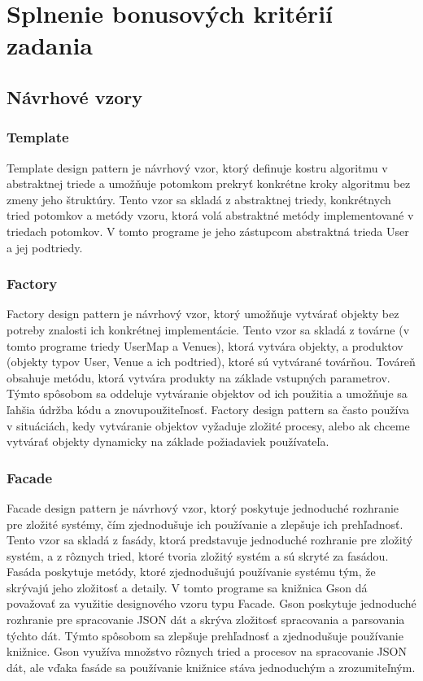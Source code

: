 \documentclass{article}
\begin{document}
\section{Splnenie bonusových kritérií zadania}
\subsection{Návrhové vzory}
\subsubsection{Template} 
Template design pattern je návrhový vzor, ktorý definuje kostru algoritmu v abstraktnej triede a umožňuje potomkom prekryť konkrétne kroky algoritmu bez zmeny jeho štruktúry. Tento vzor sa skladá z abstraktnej triedy, konkrétnych tried potomkov a metódy vzoru, ktorá volá abstraktné metódy implementované v triedach potomkov. V tomto programe je jeho zástupcom abstraktná trieda User a jej podtriedy.
\subsubsection{Factory}
Factory design pattern je návrhový vzor, ktorý umožňuje vytvárať objekty bez potreby znalosti ich konkrétnej implementácie. Tento vzor sa skladá z továrne (v tomto programe triedy UserMap a Venues), ktorá vytvára objekty, a produktov (objekty typov User, Venue a ich podtried), ktoré sú vytvárané továrňou. Továreň obsahuje metódu, ktorá vytvára produkty na základe vstupných parametrov. Týmto spôsobom sa oddeluje vytváranie objektov od ich použitia a umožňuje sa ľahšia údržba kódu a znovupoužiteľnosť. Factory design pattern sa často používa v situáciách, kedy vytváranie objektov vyžaduje zložité procesy, alebo ak chceme vytvárať objekty dynamicky na základe požiadaviek používateľa.
\subsubsection{Facade}
Facade design pattern je návrhový vzor, ktorý poskytuje jednoduché rozhranie pre zložité systémy, čím zjednodušuje ich používanie a zlepšuje ich prehľadnosť. Tento vzor sa skladá z fasády, ktorá predstavuje jednoduché rozhranie pre zložitý systém, a z rôznych tried, ktoré tvoria zložitý systém a sú skryté za fasádou. Fasáda poskytuje metódy, ktoré zjednodušujú používanie systému tým, že skrývajú jeho zložitosť a detaily.
V tomto programe sa knižnica Gson dá považovať za využitie designového vzoru typu Facade. Gson poskytuje jednoduché rozhranie pre spracovanie JSON dát a skrýva zložitosť spracovania a parsovania týchto dát. Týmto spôsobom sa zlepšuje prehľadnosť a zjednodušuje používanie knižnice. Gson využíva množstvo rôznych tried a procesov na spracovanie JSON dát, ale vďaka fasáde sa používanie knižnice stáva jednoduchým a zrozumiteľným.
\end{document}
